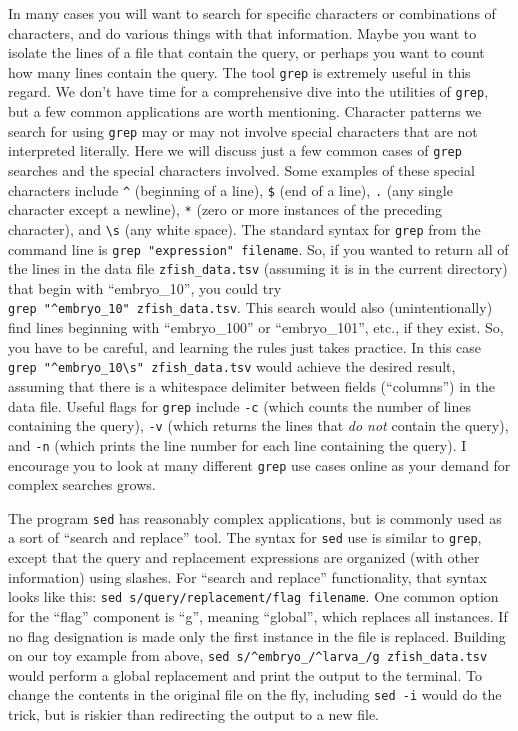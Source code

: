 \documentclass[
]{book}
\begin{document}
In many cases you will want to search for specific characters or combinations of characters, and do various things with that information. Maybe you want to isolate the lines of a file that contain the query, or perhaps you want to count how many lines contain the query. The tool \texttt{grep} is extremely useful in this regard. We don't have time for a comprehensive dive into the utilities of \texttt{grep}, but a few common applications are worth mentioning. Character patterns we search for using \texttt{grep} may or may not involve special characters that are not interpreted literally. Here we will discuss just a few common cases of \texttt{grep} searches and the special characters involved. Some examples of these special characters include \texttt{\^{}} (beginning of a line), \texttt{\$} (end of a line), \texttt{.} (any single character except a newline), \texttt{*} (zero or more instances of the preceding character), and \texttt{\textbackslash{}s} (any white space). The standard syntax for \texttt{grep} from the command line is \texttt{grep\ "expression"\ filename}. So, if you wanted to return all of the lines in the data file \texttt{zfish\_data.tsv} (assuming it is in the current directory) that begin with ``embryo\_10'', you could try \texttt{grep\ "\^{}embryo\_10"\ zfish\_data.tsv}. This search would also (unintentionally) find lines beginning with ``embryo\_100'' or ``embryo\_101'', etc., if they exist. So, you have to be careful, and learning the rules just takes practice. In this case \texttt{grep\ "\^{}embryo\_10\textbackslash{}s"\ zfish\_data.tsv} would achieve the desired result, assuming that there is a whitespace delimiter between fields (``columns'') in the data file. Useful flags for \texttt{grep} include \texttt{-c} (which counts the number of lines containing the query), \texttt{-v} (which returns the lines that \emph{do not} contain the query), and \texttt{-n} (which prints the line number for each line containing the query). I encourage you to look at many different \texttt{grep} use cases online as your demand for complex searches grows.

The program \texttt{sed} has reasonably complex applications, but is commonly used as a sort of ``search and replace'' tool. The syntax for \texttt{sed} use is similar to \texttt{grep}, except that the query and replacement expressions are organized (with other information) using slashes. For ``search and replace'' functionality, that syntax looks like this: \texttt{sed\ \textquotesingle{}s/query/replacement/flag\textquotesingle{}\ filename}. One common option for the ``flag'' component is ``g'', meaning ``global'', which replaces all instances. If no flag designation is made only the first instance in the file is replaced. Building on our toy example from above, \texttt{sed\ \textquotesingle{}s/\^{}embryo\_/\^{}larva\_/g\textquotesingle{}\ zfish\_data.tsv} would perform a global replacement and print the output to the terminal. To change the contents in the original file on the fly, including \texttt{sed\ -i} would do the trick, but is riskier than redirecting the output to a new file.
\end{document}
